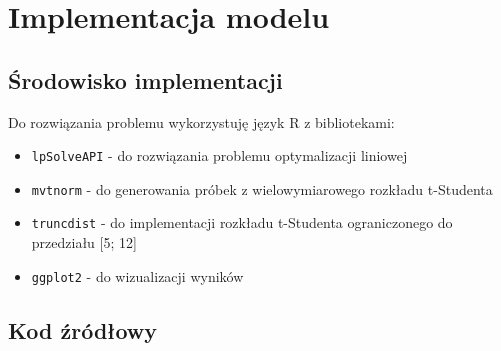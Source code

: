 \section{Implementacja modelu}

\subsection{Środowisko implementacji}

Do rozwiązania problemu wykorzystuję język R z bibliotekami:
\begin{itemize}
  \item \texttt{lpSolveAPI} - do rozwiązania problemu optymalizacji liniowej
  \item \texttt{mvtnorm} - do generowania próbek z wielowymiarowego rozkładu t-Studenta
  \item \texttt{truncdist} - do implementacji rozkładu t-Studenta ograniczonego do przedziału [5; 12]
  \item \texttt{ggplot2} - do wizualizacji wyników
\end{itemize}

\subsection{Kod źródłowy}



